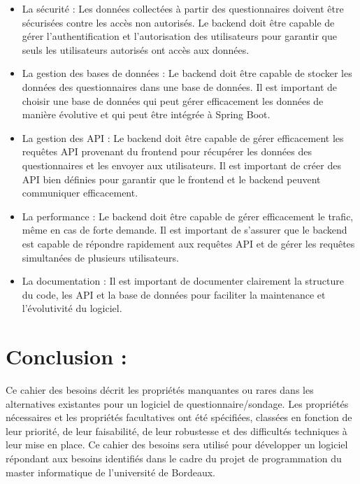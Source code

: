 \documentclass{article}
\begin{document}
\begin{itemize}[noitemsep]
\item La sécurité : Les données collectées à partir des questionnaires doivent être sécurisées contre les accès non autorisés. Le backend doit être capable de gérer l'authentification et l'autorisation des utilisateurs pour garantir que seuls les utilisateurs autorisés ont accès aux données.
\item La gestion des bases de données : Le backend doit être capable de stocker les données des questionnaires dans une base de données. Il est important de choisir une base de données qui peut gérer efficacement les données de manière évolutive et qui peut être intégrée à Spring Boot.
\item La gestion des API : Le backend doit être capable de gérer efficacement les requêtes API provenant du frontend pour récupérer les données des questionnaires et les envoyer aux utilisateurs. Il est important de créer des API bien définies pour garantir que le frontend et le backend peuvent communiquer efficacement.
\item La performance : Le backend doit être capable de gérer efficacement le trafic, même en cas de forte demande. Il est important de s'assurer que le backend est capable de répondre rapidement aux requêtes API et de gérer les requêtes simultanées de plusieurs utilisateurs.
\item La documentation : Il est important de documenter clairement la structure du code, les API et la base de données pour faciliter la maintenance et l'évolutivité du logiciel.
\end{itemize}
\section{Conclusion :}

Ce cahier des besoins décrit les propriétés manquantes ou rares dans les alternatives existantes pour un logiciel de questionnaire/sondage. Les propriétés nécessaires et les propriétés facultatives ont été spécifiées, classées en fonction de leur priorité, de leur faisabilité, de leur robustesse et des difficultés techniques à leur mise en place. Ce cahier des besoins sera utilisé pour développer un logiciel répondant aux besoins identifiés dans le cadre du projet de programmation du master informatique de l'université de Bordeaux.
\end{document}
